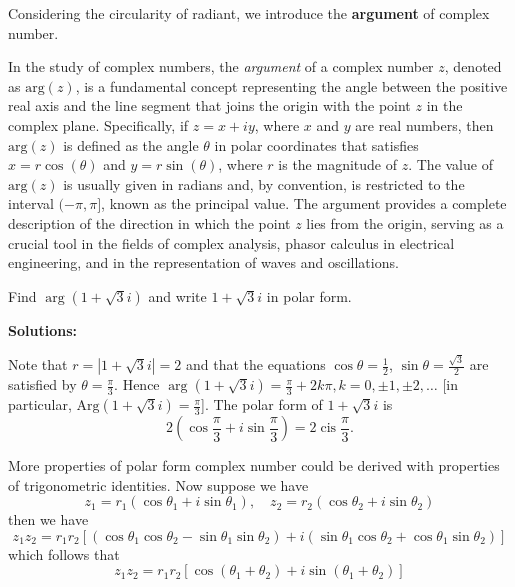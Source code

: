 \documentclass[
	12pt, %
	fleqn, %
	a4paper, %
]{LegrandOrangeBook}
\begin{document}
Considering the circularity of radiant, we introduce the \textbf{argument} of complex number.
\begin{definition} \label{polarform}
In the study of complex numbers, the \emph{argument} of a complex number \( z \), denoted as \( \text{arg}(z) \), is a fundamental concept representing the angle between the positive real axis and the line segment that joins the origin with the point \( z \) in the complex plane. Specifically, if \( z = x + iy \), where \( x \) and \( y \) are real numbers, then \( \text{arg}(z) \) is defined as the angle \( \theta \) in polar coordinates that satisfies \( x = r\cos(\theta) \) and \( y = r\sin(\theta) \), where \( r \) is the magnitude of \( z \). The value of \( \text{arg}(z) \) is usually given in radians and, by convention, is restricted to the interval \( (-\pi, \pi] \), known as the principal value. The argument provides a complete description of the direction in which the point \( z \) lies from the origin, serving as a crucial tool in the fields of complex analysis, phasor calculus in electrical engineering, and in the representation of waves and oscillations.
\end{definition}

\begin{example}
    Find $\arg(1 + \sqrt{3}i)$ and write $1 + \sqrt{3}i$ in polar form.
\end{example}
\textbf{Solutions:}

Note that $r = |1 + \sqrt{3}i| = 2$ and that the equations $\cos\theta = \frac{1}{2}$, $\sin\theta = \frac{\sqrt{3}}{2}$ are satisfied by $\theta = \frac{\pi}{3}$. Hence $\arg(1 + \sqrt{3}i) = \frac{\pi}{3} + 2k\pi, k = 0, \pm1, \pm2, \ldots$ [in particular, $\text{Arg}(1 + \sqrt{3}i) = \frac{\pi}{3}$]. The polar form of $1 + \sqrt{3}i$ is
\[2(\cos\frac{\pi}{3} + i\sin\frac{\pi}{3}) = 2\operatorname{cis}\frac{\pi}{3}.\]

More properties of polar form complex number could be derived with properties of trigonometric identities.
Now suppose we have 
$$z_1=r_1\left(\cos\theta_1+i\sin\theta_1\right),\quad z_2=r_2\left(\cos\theta_2+i\sin\theta_2\right)$$
then we have
$$z_1z_2=r_1r_2\left[(\cos\theta_1\cos\theta_2-\sin\theta_1\sin\theta_2)+i(\sin\theta_1\cos\theta_2+\cos\theta_1\sin\theta_2)\right]$$
which follows that
\begin{equation} \label{polarprod}
    z_1z_2=r_1r_2\left[\cos\left(\theta_1+\theta_2\right)+i\sin\left(\theta_1+\theta_2\right)\right]
\end{equation}
\end{document}
